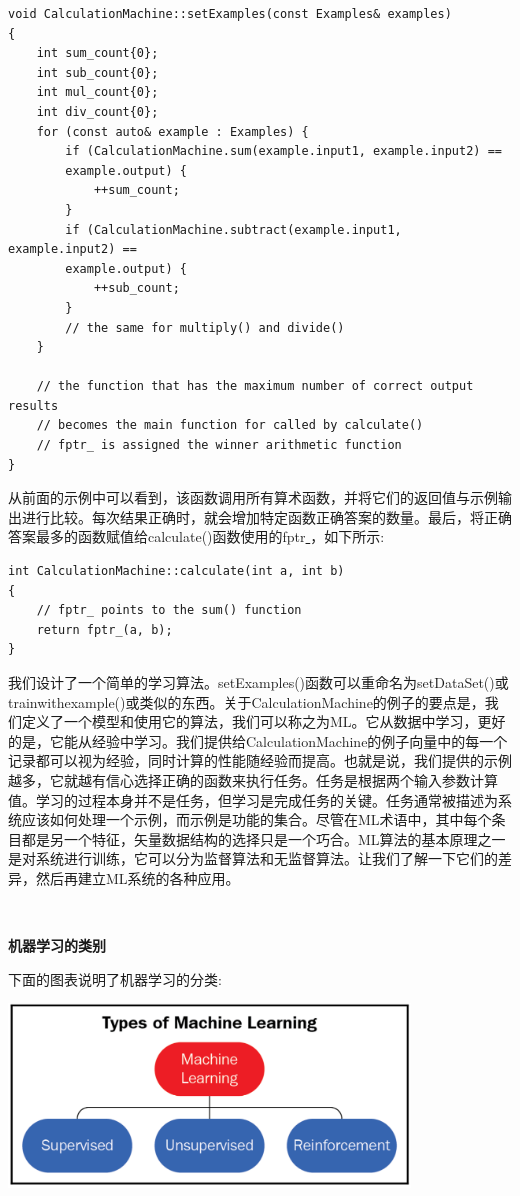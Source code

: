\begin{lstlisting}[caption={}]
void CalculationMachine::setExamples(const Examples& examples)
{
	int sum_count{0};
	int sub_count{0};
	int mul_count{0};
	int div_count{0};
	for (const auto& example : Examples) {
		if (CalculationMachine.sum(example.input1, example.input2) ==
		example.output) {
			++sum_count;
		}
		if (CalculationMachine.subtract(example.input1, example.input2) ==
		example.output) {
			++sub_count;
		}
		// the same for multiply() and divide()
	}

	// the function that has the maximum number of correct output results
	// becomes the main function for called by calculate()
	// fptr_ is assigned the winner arithmetic function
}
\end{lstlisting}

从前面的示例中可以看到，该函数调用所有算术函数，并将它们的返回值与示例输出进行比较。每次结果正确时，就会增加特定函数正确答案的数量。最后，将正确答案最多的函数赋值给calculate()函数使用的fptr\underline{ }，如下所示: \par

\begin{lstlisting}[caption={}]
int CalculationMachine::calculate(int a, int b)
{
	// fptr_ points to the sum() function
	return fptr_(a, b);
}
\end{lstlisting}

我们设计了一个简单的学习算法。setExamples()函数可以重命名为setDataSet()或trainwithexample()或类似的东西。关于CalculationMachine的例子的要点是，我们定义了一个模型和使用它的算法，我们可以称之为ML。它从数据中学习，更好的是，它能从经验中学习。我们提供给CalculationMachine的例子向量中的每一个记录都可以视为经验，同时计算的性能随经验而提高。也就是说，我们提供的示例越多，它就越有信心选择正确的函数来执行任务。任务是根据两个输入参数计算值。学习的过程本身并不是任务，但学习是完成任务的关键。任务通常被描述为系统应该如何处理一个示例，而示例是功能的集合。尽管在ML术语中，其中每个条目都是另一个特征，矢量数据结构的选择只是一个巧合。ML算法的基本原理之一是对系统进行训练，它可以分为监督算法和无监督算法。让我们了解一下它们的差异，然后再建立ML系统的各种应用。 \par

\noindent\textbf{}\ \par
\textbf{机器学习的类别} \ \par
下面的图表说明了机器学习的分类: \par

\begin{center}
	\includegraphics[width=0.8\textwidth]{content/Section-3/Chapter-15/6}
\end{center}

